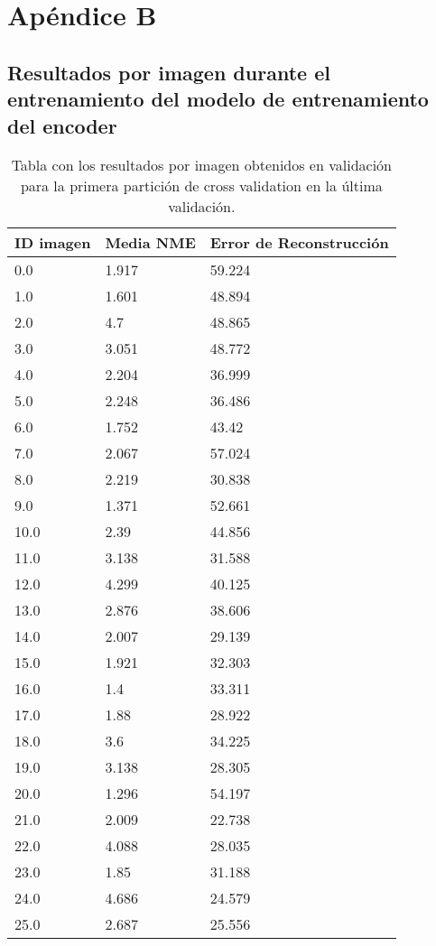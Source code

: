 
\chapter{Apéndice B}\label{ap:apendiceB}

\section{Resultados por imagen durante el entrenamiento del modelo de entrenamiento del encoder}

\begin{table}[!ht]
    \centering
    \caption{Tabla con los resultados por imagen obtenidos en validación para la primera partición de cross validation en la última validación.}
    \begin{tabular}{|l|l|l|}
    \hline
        ID imagen & Media NME & Error de Reconstrucción \\ \hline
        0.0 & 1.917 & 59.224 \\ \hline
        1.0 & 1.601 & 48.894 \\ \hline
        2.0 & 4.7 & 48.865 \\ \hline
        3.0 & 3.051 & 48.772 \\ \hline
        4.0 & 2.204 & 36.999 \\ \hline
        5.0 & 2.248 & 36.486 \\ \hline
        6.0 & 1.752 & 43.42 \\ \hline
        7.0 & 2.067 & 57.024 \\ \hline
        8.0 & 2.219 & 30.838 \\ \hline
        9.0 & 1.371 & 52.661 \\ \hline
        10.0 & 2.39 & 44.856 \\ \hline
        11.0 & 3.138 & 31.588 \\ \hline
        12.0 & 4.299 & 40.125 \\ \hline
        13.0 & 2.876 & 38.606 \\ \hline
        14.0 & 2.007 & 29.139 \\ \hline
        15.0 & 1.921 & 32.303 \\ \hline
        16.0 & 1.4 & 33.311 \\ \hline
        17.0 & 1.88 & 28.922 \\ \hline
        18.0 & 3.6 & 34.225 \\ \hline
        19.0 & 3.138 & 28.305 \\ \hline
        20.0 & 1.296 & 54.197 \\ \hline
        21.0 & 2.009 & 22.738 \\ \hline
        22.0 & 4.088 & 28.035 \\ \hline
        23.0 & 1.85 & 31.188 \\ \hline
        24.0 & 4.686 & 24.579 \\ \hline
        25.0 & 2.687 & 25.556 \\ \hline
    \end{tabular}
    \label{table:Encoder_images_1}
\end{table}

